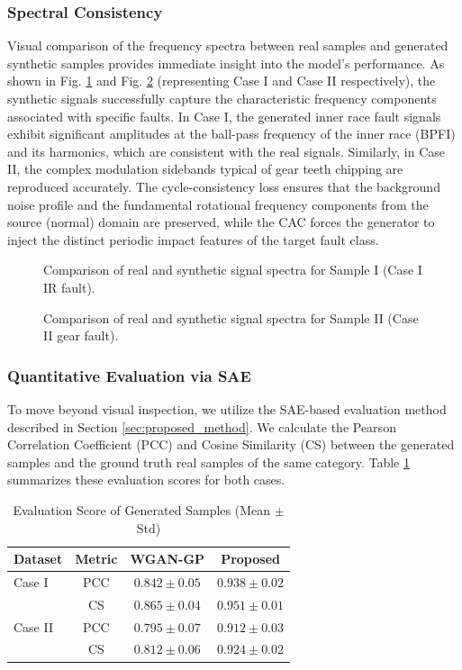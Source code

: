\subsubsection{Spectral Consistency}
Visual comparison of the frequency spectra between real samples and generated synthetic samples provides immediate insight into the model's performance. As shown in Fig. \ref{fig:gen_quality_1} and Fig. \ref{fig:gen_quality_2} (representing Case I and Case II respectively), the synthetic signals successfully capture the characteristic frequency components associated with specific faults. In Case I, the generated inner race fault signals exhibit significant amplitudes at the ball-pass frequency of the inner race (BPFI) and its harmonics, which are consistent with the real signals. Similarly, in Case II, the complex modulation sidebands typical of gear teeth chipping are reproduced accurately. The cycle-consistency loss ensures that the background noise profile and the fundamental rotational frequency components from the source (normal) domain are preserved, while the CAC forces the generator to inject the distinct periodic impact features of the target fault class.

\begin{figure}[htbp]
\centering
\caption{Comparison of real and synthetic signal spectra for Sample I (Case I IR fault).}
\label{fig:gen_quality_1}
\end{figure}

\begin{figure}[htbp]
\centering
\caption{Comparison of real and synthetic signal spectra for Sample II (Case II gear fault).}
\label{fig:gen_quality_2}
\end{figure}

\subsubsection{Quantitative Evaluation via SAE}
To move beyond visual inspection, we utilize the SAE-based evaluation method described in Section \ref{sec:proposed_method}. We calculate the Pearson Correlation Coefficient (PCC) and Cosine Similarity (CS) between the generated samples and the ground truth real samples of the same category. Table \ref{tab:gen_scores} summarizes these evaluation scores for both cases.

\begin{table}[htbp]
\centering
\caption{Evaluation Score of Generated Samples (Mean $\pm$ Std)}
\label{tab:gen_scores}
\begin{tabular}{lccc}
\hline
\textbf{Dataset} & \textbf{Metric} & \textbf{WGAN-GP} & \textbf{Proposed} \\ \hline
Case I & PCC & $0.842 \pm 0.05$ & $0.938 \pm 0.02$ \\
       & CS  & $0.865 \pm 0.04$ & $0.951 \pm 0.01$ \\ \hline
Case II & PCC & $0.795 \pm 0.07$ & $0.912 \pm 0.03$ \\
        & CS  & $0.812 \pm 0.06$ & $0.924 \pm 0.02$ \\
\hline
\end{tabular}
\end{table}

